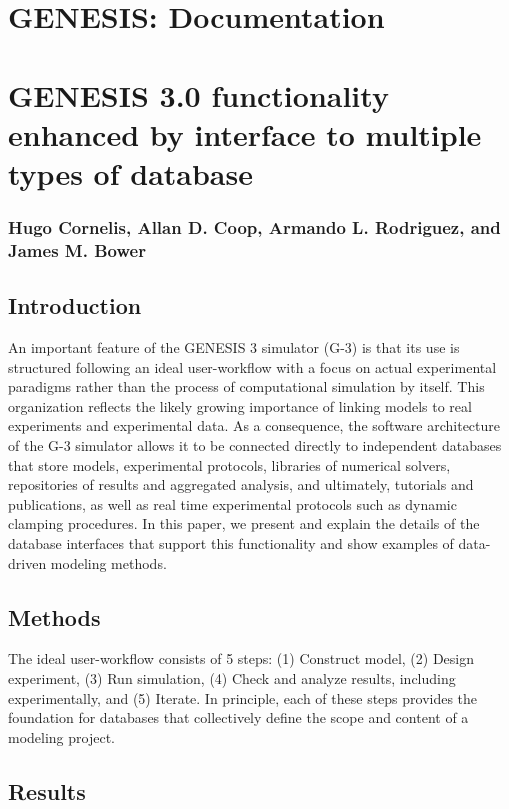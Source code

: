 \documentclass[12pt]{article}
\begin{document}
\section*{GENESIS: Documentation}

\section*{GENESIS 3.0 functionality enhanced by interface to multiple types of database}

\subsubsection*{Hugo Cornelis, Allan D. Coop, Armando L. Rodriguez, and James M. Bower}

\subsection*{Introduction}

An important feature of the GENESIS 3 simulator (G-3) is that its use
is structured following an ideal user-workflow with a focus on actual
experimental paradigms rather than the process of computational
simulation by itself.  This organization reflects the likely growing
importance of linking models to real experiments and experimental
data.  As a consequence, the software architecture of the G-3
simulator allows it to be connected directly to independent databases
that store models, experimental protocols, libraries of numerical
solvers, repositories of results and aggregated analysis, and
ultimately, tutorials and publications, as well as real time
experimental protocols such as dynamic clamping procedures.  In this
paper, we present and explain the details of the database interfaces
that support this functionality and show examples of data-driven
modeling methods.


\subsection*{Methods}

The ideal user-workflow consists of 5 steps: (1) Construct model, (2)
Design experiment, (3) Run simulation, (4) Check and analyze results,
including experimentally, and (5) Iterate. In principle, each of these
steps provides the foundation for databases that collectively define
the scope and content of a modeling project.

\subsection*{Results}
\end{document}
